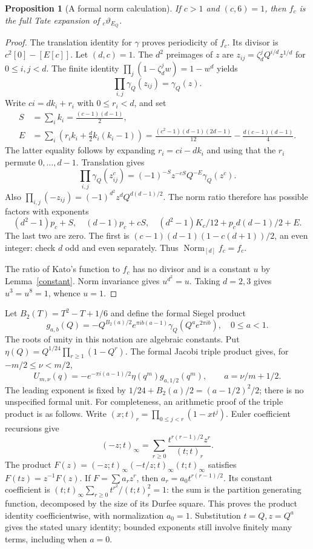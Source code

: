 \documentclass[11pt]{article}
\newtheorem{proposition}[theorem]{Proposition}
\theoremstyle{remark}\newtheorem{remark}[theorem]{Remark}
\begin{document}
\begin{proposition}[A formal norm calculation]\label{norm}
If $c>1$ and $(c,6)=1$, then $f_c$ is the full Tate expansion of
${}_c\vartheta_{E_Q}$.
\end{proposition}
\begin{proof}
The translation identity for $\gamma$ proves periodicity of $f_c$.
Its divisor is $c^2[0]-[E[c]]$. Let $(d,c)=1$. The $d^2$ preimages of $z$
are $z_{ij}=\zeta_d^jQ^{i/d}z^{1/d}$ for $0\leq i,j<d$.
The finite identity $\prod_j(1-\zeta_d^jw)=1-w^d$ yields
\[
 \prod_{i,j}\gamma_Q(z_{ij})=\gamma_Q(z).
\]
Write $ci=dk_i+r_i$ with $0\leq r_i<d$, and set
\begin{align*}
 S&=\sum_i k_i=\frac{(c-1)(d-1)}2,\\
 E&=\sum_i\left(r_i k_i+\frac d2 k_i(k_i-1)\right)
 =\frac{(c^2-1)(d-1)(2d-1)}{12}
       -\frac{d(c-1)(d-1)}4.
\end{align*}
The latter equality follows by expanding $r_i=ci-dk_i$ and using that
the $r_i$ permute $0,\ldots,d-1$. Translation gives
\[
 \prod_{i,j}\gamma_Q(z_{ij}^{c})
 =(-1)^{-S}z^{-cS}Q^{-E}\gamma_Q(z^c).
\]
Also $\prod_{i,j}(-z_{ij})=(-1)^{d^2}z^dQ^{d(d-1)/2}$.
The norm ratio therefore has possible factors with exponents
\[
 (d^2-1)p_c+S,\quad (d-1)p_c+cS,\quad
 (d^2-1)K_c/12+p_c d(d-1)/2+E.
\]
The last two are zero. The first is
$(c-1)(d-1)(1-c(d+1))/2$, an even integer: check $d$ odd and even
separately. Thus $\operatorname{Norm}_{[d]}f_c=f_c$.

The ratio of Kato's function to $f_c$ has no divisor and is a constant
$u$ by Lemma~\ref{constant}. Norm invariance gives $u^{d^2}=u$.
Taking $d=2,3$ gives $u^3=u^8=1$, whence $u=1$.
\end{proof}

Let $B_2(T)=T^2-T+1/6$ and define the formal Siegel product
\[
 g_{a,b}(Q)=-Q^{B_2(a)/2}e^{\pi i b(a-1)}
                         \gamma_Q(Q^a e^{2\pi i b}),\quad 0\leq a<1.
\]
The roots of unity in this notation are algebraic constants. Put
$\eta(Q)=Q^{1/24}\prod_{r\geq1}(1-Q^r)$.
The formal Jacobi triple product gives, for $-m/2\leq\nu<m/2$,
\[
 U_{m,\nu}(q)=-e^{-\pi i(a-1)/2}\eta(q^m)g_{a,1/2}(q^m),
 \qquad a=\nu/m+1/2.
\]
The leading exponent is fixed by
$1/24+B_2(a)/2=(a-1/2)^2/2$; there is no unspecified formal unit.
For completeness, an arithmetic proof of the triple product is as follows.
Write $(x;t)_r=\prod_{0\leq j<r}(1-xt^j)$. Euler coefficient recursions give
\[
 (-z;t)_\infty=\sum_{r\geq0}\frac{t^{r(r-1)/2}z^r}{(t;t)_r}.
\]
The product $F(z)=(-z;t)_\infty(-t/z;t)_\infty(t;t)_\infty$ satisfies
$F(tz)=z^{-1}F(z)$. If $F=\sum a_rz^r$, then
$a_r=a_0t^{r(r-1)/2}$. Its constant coefficient is
$(t;t)_\infty\sum_{r\geq0}t^{r^2}/(t;t)_r^2=1$: the sum is the
partition generating function, decomposed by the size of its Durfee square.
This proves the product identity coefficientwise, with normalization $a_0=1$.
Substitution $t=Q,z=Q^a$ gives the stated unary identity; bounded exponents
still involve finitely many terms, including when $a=0$.
\end{document}
